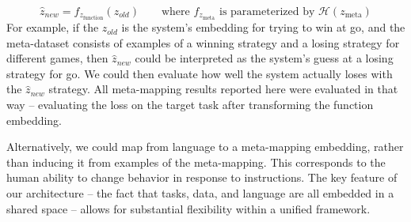\documentclass{article}
\begin{document}
\[\hat{z}_{new} = f_{z_{\text{function}}}(z_{old}) \qquad \text{where } f_{z_{\text{meta}}} \text{ is parameterized by } \mathcal{H}\left(z_{\text{meta}}\right)\]
For example, if the $z_{old}$ is the system's embedding for trying to win at go, and the meta-dataset consists of examples of a winning strategy and a losing strategy for different games, then $\hat{z}_{new}$ could be interpreted as the system's guess at a losing strategy for go. We could then evaluate how well the system actually loses with the $\hat{z}_{new}$ strategy. All meta-mapping results reported here were evaluated in that way -- evaluating the loss on the target task after transforming the function embedding. \par
Alternatively, we could map from language to a meta-mapping embedding, rather than inducing it from examples of the meta-mapping. This corresponds to the human ability to change behavior in response to instructions. The key feature of our architecture -- the fact that tasks, data, and language are all embedded in a shared space -- allows for substantial flexibility within a unified framework. 

%
\end{document}

